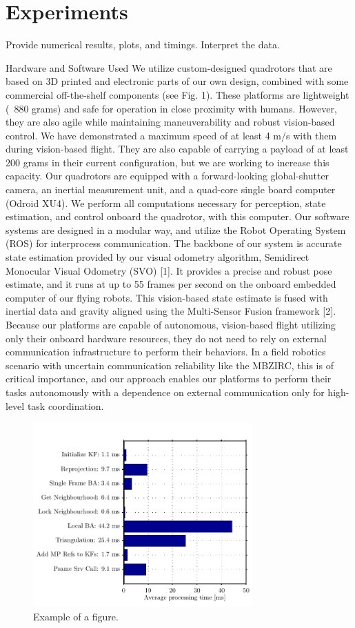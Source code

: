 \chapter{Experiments}\label{chap:experiments}

Provide numerical results, plots, and timings. Interpret the data.

Hardware and Software Used
We utilize custom-designed quadrotors that are based on 3D
printed and electronic parts of our own design, combined with
some commercial off-the-shelf components (see Fig. 1). These
platforms are lightweight (~880 grams) and safe for operation
in close proximity with humans. However, they are also agile
while maintaining maneuverability and robust vision-based
control. We have demonstrated a maximum speed of at least
4 m/s with them during vision-based flight. They are also
capable of carrying a payload of at least 200 grams in their
current configuration, but we are working to increase this
capacity. Our quadrotors are equipped with a forward-looking
global-shutter camera, an inertial measurement unit, and a
quad-core single board computer (Odroid XU4). We perform
all computations necessary for perception, state estimation,
and control onboard the quadrotor, with this computer.
Our software systems are designed in a modular way, and
utilize the Robot Operating System (ROS) for interprocess
communication. The backbone of our system is accurate state
estimation provided by our visual odometry algorithm, Semidirect
Monocular Visual Odometry (SVO) [1]. It provides a
precise and robust pose estimate, and it runs at up to 55
frames per second on the onboard embedded computer of our
flying robots. This vision-based state estimate is fused with
inertial data and gravity aligned using the Multi-Sensor Fusion
framework [2]. Because our platforms are capable of autonomous, vision-based flight utilizing only their
onboard hardware resources, they do not need to rely on external communication infrastructure to
perform their behaviors. In a field robotics scenario with uncertain communication reliability like the
MBZIRC, this is of critical importance, and our approach enables our platforms to perform their tasks
autonomously with a dependence on external communication only for high-level task coordination.

\begin{figure}[h]
   \centering
   \includegraphics[width=0.75\textwidth]{img/processing_time.pdf}
   \caption{Example of a figure.}
   \label{img:timing}
\end{figure}